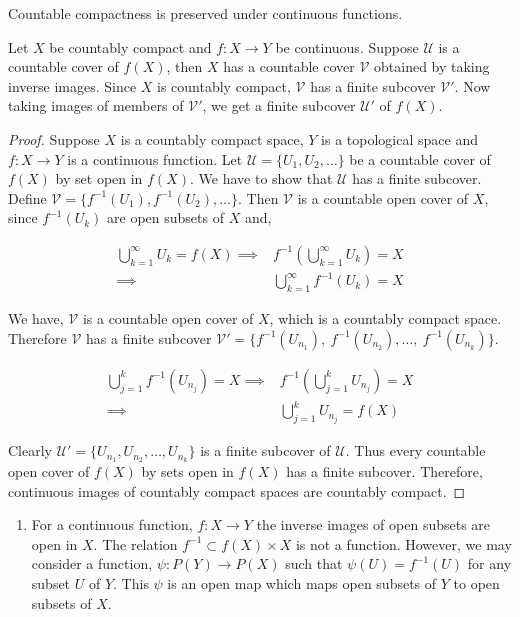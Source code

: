 \begin{theorem}
	Countable compactness is preserved under continuous functions.
	\cite[11.1.2]{joshi}
\end{theorem}
\begin{synopsis}
	Let $X$ be countably compact and $f:X\to Y$ be continuous.
	Suppose $\mathcal{U}$ is a countable cover of $f(X)$, then $X$ has a countable cover $\mathcal{V}$ obtained by taking inverse images.
	Since $X$ is countably compact, $\mathcal{V}$ has a finite subcover $\mathcal{V}'$.
	Now taking images of members of $\mathcal{V}'$, we get a finite subcover $\mathcal{U}'$ of $f(X)$.
\end{synopsis}
\begin{proof}
	Suppose $X$ is a countably compact space, $Y$ is a topological space and $f:X \to Y$ is a continuous function.
	Let $\mathcal{U} = \{ U_1, U_2,\dotsc \}$ be a countable cover of $f(X)$ by set open in $f(X)$.
	We have to show that $\mathcal{U}$ has a finite subcover.\\


	Define $\mathcal{V} = \{ f^{-1}(U_1), f^{-1}(U_2), \dotsc \}$.
	Then $\mathcal{V}$ is a countable open cover of $X$, since $f^{-1}(U_k)$ are open subsets of $X$ and,

\begin{align*}
	\bigcup_{k = 1}^\infty U_k = f(X) \implies & f^{-1}\left(\bigcup_{k=1}^\infty U_k\right) = X\\
	\implies & \bigcup_{k = 1}^\infty f^{-1}(U_k) = X
\end{align*}

	We have, $\mathcal{V}$ is a countable open cover of $X$, which is a countably compact space.
	Therefore $\mathcal{V}$ has a finite subcover $\mathcal{V}' = \{ f^{-1}(U_{n_1}),\ f^{-1}(U_{n_2}),\dots,\ f^{-1}(U_{n_k}) \}$.

\begin{align*}
	\bigcup_{j=1}^k f^{-1}(U_{n_j}) = X \implies & f^{-1}\left(\bigcup_{j=1}^k U_{n_j}\right) = X\\
	\implies & \bigcup_{j=1}^k U_{n_j} = f(X)
\end{align*}

	Clearly $\mathcal{U}' = \{ U_{n_1},U_{n_2},\dots,U_{n_k}\}$ is a finite subcover of $\mathcal{U}$.
	Thus every countable open cover of $f(X)$ by sets open in $f(X)$ has a finite subcover.
	Therefore, continuous images of countably compact spaces are countably compact.
\end{proof}

\begin{remark}
	\begin{enumerate}
		\item For a continuous function, $f : X \to Y$ the inverse images of open subsets are open in $X$.
			The relation $f^{-1} \subset f(X) \times X$ is not a function.
			However, we may consider a function, $\psi : P(Y) \to P(X)$ such that $\psi(U) = f^{-1}(U)$ for any subset $U$ of $Y$.
			This $\psi$ is an open map which maps open subsets of $Y$ to open subsets of $X$.
	\end{enumerate}
\end{remark}

